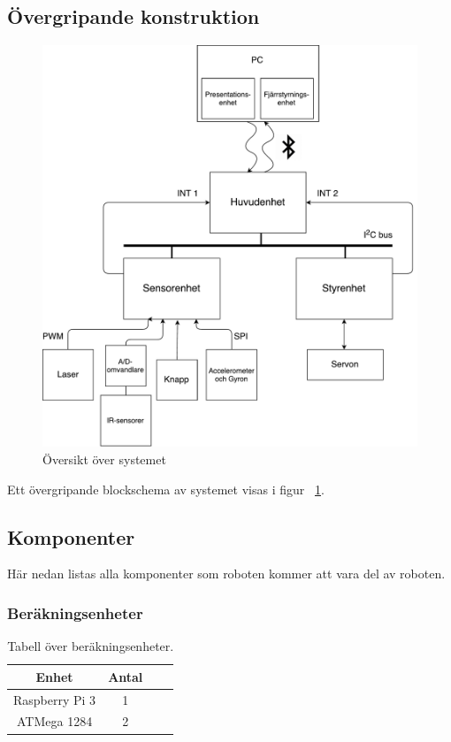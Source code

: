 \documentclass{article}
\begin{document}
\subsection{Övergripande konstruktion}
\begin{figure}[H]
\centering
\includegraphics[scale=0.35]{oversikt_systemet2}
\caption{Översikt över systemet}
\label{fig:oversikt_systemet2}
\end{figure}

Ett övergripande blockschema av systemet visas i figur ~\ref{fig:oversikt_systemet2}.

\subsection{Komponenter}
Här nedan listas alla komponenter som roboten kommer att vara del av roboten.

\subsubsection{Beräkningsenheter}
\begin{table}[H]
  \centering
  \begin{tabular}{ | c | c | c | c |}
    \hline
    \textbf{Enhet} & \textbf{Antal} \\
    \hline
    Raspberry Pi 3 & 1 \\
    \hline
    ATMega 1284 & 2 \\
    \hline
  \end{tabular}
  \caption{ Tabell över beräkningsenheter. }
\end{table}
\end{document}
